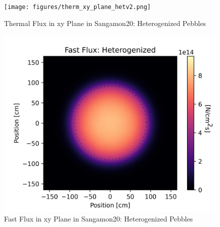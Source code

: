 \begin{figure}[H]
\centering

\texttt{[image: figures/therm\_xy\_plane\_hetv2.png]}
\caption{Thermal Flux in xy Plane in Sangamon20: Heterogenized Pebbles}
\label{fig:het-plane-therm}

\end{figure}

\begin{figure}[H]
\centering

\includegraphics[width=1.0\linewidth]{figures/fast_xy_plane_hetv2.png}
\caption{Fast Flux in xy Plane in Sangamon20: Heterogenized Pebbles}
\label{fig:het-plane-fast}

\end{figure}